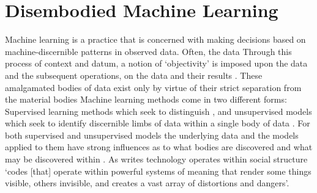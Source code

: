 \section{Disembodied Machine Learning}
Machine learning is a practice that is concerned with making decisions based on machine-discernible patterns in observed data.
Often, the data 
Through this process of  context and datum, a notion of `objectivity' is imposed upon the data and the subsequent operations,  on the data and their results .
These amalgamated bodies of data exist only by virtue of their strict separation from the material bodies 
Machine learning methods come in two different forms: Supervised learning methods which seek to  distinguish 
, and unsupervised models which seek to identify discernible limbs of data within a single body of data .
For both supervised and unsupervised models  the underlying data and the models applied to them have strong influences as to what bodies are discovered and what may be discovered within .
As \citet{Benjamin:2019} writes technology operates within social structure `codes [that] operate within powerful systems of meaning that render some things visible, others invisible, and creates a vast array of distortions and dangers'.\vspace{5mm}

